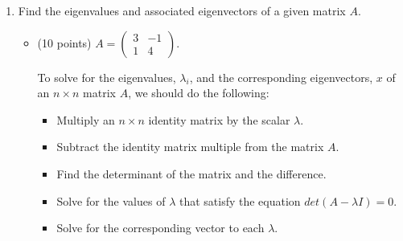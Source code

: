 \documentclass[fleqn]{article}
\begin{document}
\begin{enumerate}
    \item Find the eigenvalues and associated eigenvectors of a given matrix $A$.
      \begin{itemize}
        \item (10 points) $A=\begin{pmatrix}
          3 & -1
          \\
          1 & 4
        \end{pmatrix}$.

          \textcolor{hwColor}{
            To solve for the eigenvalues, $\lambda_i$, and the corresponding eigenvectors, $x$ of an $n \times n$ matrix 
            $A$, we should do the following: 
            \\
            \begin{itemize}
              \item Multiply an $n \times n$ identity matrix by the scalar $\lambda$.
              \item Subtract the identity matrix multiple from the matrix $A$.
              \item Find the determinant of the matrix and the difference.
              \item Solve for the values of $\lambda$ that satisfy the equation $det\left(A-\lambda I\right)=0$.
              \item Solve for the corresponding vector to each $\lambda$.
            \end{itemize}
          }


\end{itemize}
\end{enumerate}
\end{document}
